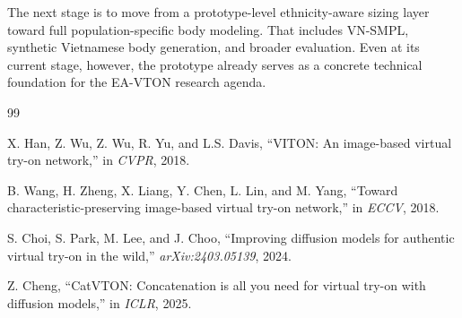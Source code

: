\documentclass[a4paper,10pt,twocolumn]{article}
\begin{document}
The next stage is to move from a prototype-level ethnicity-aware sizing layer toward full population-specific body modeling. That includes VN-SMPL, synthetic Vietnamese body generation, and broader evaluation. Even at its current stage, however, the prototype already serves as a concrete technical foundation for the EA-VTON research agenda.

\begin{thebibliography}{99}

X. Han, Z. Wu, Z. Wu, R. Yu, and L.S. Davis, ``VITON: An image-based virtual try-on network,'' in \textit{CVPR}, 2018.

B. Wang, H. Zheng, X. Liang, Y. Chen, L. Lin, and M. Yang, ``Toward characteristic-preserving image-based virtual try-on network,'' in \textit{ECCV}, 2018.

S. Choi, S. Park, M. Lee, and J. Choo, ``Improving diffusion models for authentic virtual try-on in the wild,'' \textit{arXiv:2403.05139}, 2024.

Z. Cheng, ``CatVTON: Concatenation is all you need for virtual try-on with diffusion models,'' in \textit{ICLR}, 2025.

\end{thebibliography}
\end{document}
